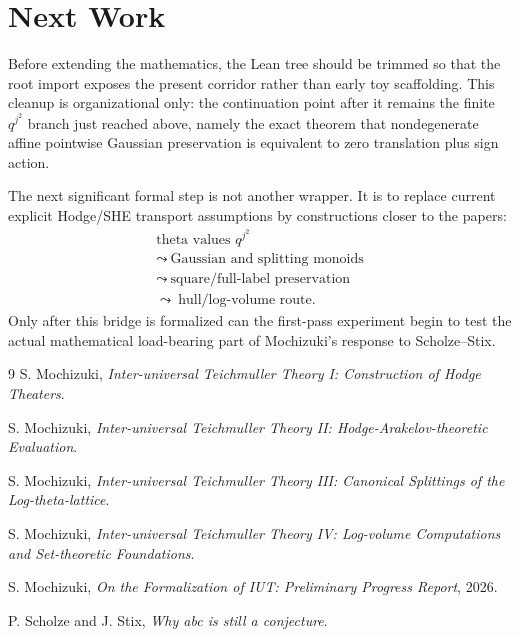 \documentclass[11pt]{article}
\begin{document}
\section{Next Work}

Before extending the mathematics, the Lean tree should be trimmed so that the
root import exposes the present corridor rather than early toy scaffolding.  This
cleanup is organizational only: the continuation point after it remains the
finite \(q^{j^2}\) branch just reached above, namely the exact theorem that
nondegenerate affine pointwise Gaussian preservation is equivalent to zero
translation plus sign action.

The next significant formal step is not another wrapper.  It is to replace
current explicit Hodge/SHE transport assumptions by constructions closer to the
papers:
\[
\begin{array}{c}
\text{theta values }q^{j^2}\\
\leadsto\ \text{Gaussian and splitting monoids}\\
\leadsto\ \text{square/full-label preservation}\\
\leadsto\ \text{hull/log-volume route}.
\end{array}
\]
Only after this bridge is formalized can the first-pass experiment begin to test
the actual mathematical load-bearing part of Mochizuki's response to
Scholze--Stix.

\begingroup
\small
\begin{thebibliography}{9}
S. Mochizuki, \emph{Inter-universal Teichmuller Theory I:
Construction of Hodge Theaters}.

S. Mochizuki, \emph{Inter-universal Teichmuller Theory II:
Hodge-Arakelov-theoretic Evaluation}.

S. Mochizuki, \emph{Inter-universal Teichmuller Theory III:
Canonical Splittings of the Log-theta-lattice}.

S. Mochizuki, \emph{Inter-universal Teichmuller Theory IV:
Log-volume Computations and Set-theoretic Foundations}.

S. Mochizuki, \emph{On the Formalization of IUT: Preliminary Progress Report},
2026.

P. Scholze and J. Stix, \emph{Why abc is still a conjecture}.
\end{thebibliography}
\endgroup
\end{document}
